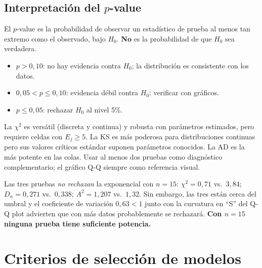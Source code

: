 \documentclass[11pt, letterpaper]{article}
\begin{document}
\subsection{Interpretación del $p$-value}

\begin{definicionbox}[$p$-value]
El $p$-value es la probabilidad de observar un estadístico de prueba al menos tan extremo como el observado, bajo $H_0$. \textbf{No} es la probabilidad de que $H_0$ sea verdadera.
\end{definicionbox}

\begin{itemize}
    \item $p > 0{,}10$: no hay evidencia contra $H_0$; la distribución es consistente con los datos.
    \item $0{,}05 < p \le 0{,}10$: evidencia débil contra $H_0$; verificar con gráficos.
    \item $p \le 0{,}05$: rechazar $H_0$ al nivel 5\%.
\end{itemize}

\begin{notabox}
La $\chi^2$ es versátil (discreta y continua) y robusta con parámetros estimados, pero requiere celdas con $E_j\ge5$. La KS es más poderosa para distribuciones continuas pero sus valores críticos estándar suponen parámetros conocidos. La AD es la más potente en las colas. Usar al menos dos pruebas como diagnóstico complementario; el gráfico Q-Q siempre como referencia visual.
\end{notabox}

\begin{resultadobox}
Las tres pruebas \emph{no rechazan} la exponencial con $n=15$: $\chi^2=0{,}71$ vs.\ $3{,}84$; $D_n=0{,}271$ vs.\ $0{,}338$; $A^2=1{,}207$ vs.\ $1{,}32$. Sin embargo, las tres están cerca del umbral y el coeficiente de variación $0{,}63<1$ junto con la curvatura en ``S'' del Q-Q plot advierten que con más datos probablemente se rechazará. \textbf{Con $n=15$ ninguna prueba tiene suficiente potencia.}
\end{resultadobox}

\section{Criterios de selección de modelos}
\end{document}
